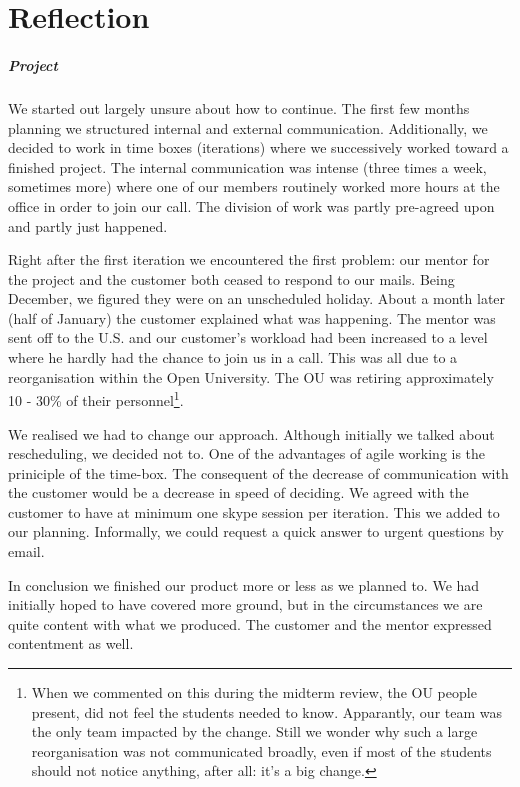 \chapter{Reflection}
\paragraph{Project} We started out largely unsure about how to continue. The first few months
planning we structured internal and external communication. Additionally, we decided to 
work in time boxes (iterations) where we successively worked toward a finished project. 
The internal communication was intense (three times a week, sometimes more) where one of our
members routinely worked more hours at the office in order to join our call. The division of work 
was partly pre-agreed upon and partly just happened.

Right after the first iteration we encountered the first problem: our mentor for the project 
and the customer both ceased to respond to our mails. Being December, we figured they were 
on an unscheduled holiday. About a month later (half of January) the customer explained 
what was happening. The mentor was sent off to the U.S. and our customer's workload had been 
increased to a level where he hardly had the chance to join us in a call. This was all due to 
a reorganisation within the Open University. The OU was retiring approximately 10 - 30\% of their
personnel\footnote{When we commented on this during the midterm review, the OU people present,
did not feel the students needed to know. Apparantly, our team was the only team impacted 
by the change. Still we wonder why such a large reorganisation was not communicated broadly, 
even if most of the students should not notice anything, after all: it's a big change.}.
 
We realised we had to change our approach. Although initially we talked about rescheduling,
we decided not to. One of the advantages of agile working is the priniciple of the time-box. 
The consequent of the decrease of communication with the customer would be a decrease in speed
of deciding. We agreed with the customer to have at minimum one skype session per iteration. 
This we added to our planning. Informally, we could request a quick answer to urgent questions
by email.

In conclusion we finished our product more or less as we planned to. We had initially
hoped to have covered more ground, but in the circumstances we are quite content with what 
we produced. The customer and the mentor expressed contentment as well.

